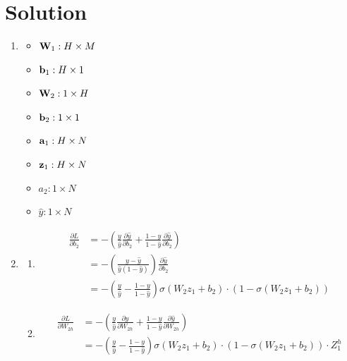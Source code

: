 \documentclass[submit]{harvardml}
\newenvironment{answer}
  {\section*{Solution}}
{}
\begin{document}
\begin{answer}
  \begin{enumerate}
    \item \begin{itemize}
            \item $\bold{W}_1 : H \times M$
            \item $\bold{b}_1 : H \times 1$
            \item $\bold{W}_2 : 1 \times H$
            \item $\bold{b}_2 : 1 \times 1$
            \item $\bold{a}_1 : H \times N$
            \item $\bold{z}_1 : H \times N$
            \item $a_2 : 1 \times N$
            \item $\hat{y} : 1 \times N$
          \end{itemize}

    \item \begin{enumerate}
            \item
                  \begin{align*}
                    \frac {\partial L}{\partial b_2} & = -\left( \frac{y}{\hat{y}} \frac{\partial \hat{y}}{\partial b_2} + \frac{1-y}{1-\hat{y}} \frac{\partial \hat{y}}{\partial b_2} \right) \\
&= -\left( \frac{y - \hat{y}}{\hat{y}(1 - \hat{y})} \right) \frac{\partial \hat{y}}{\partial b_2} \\
&= -\left( \frac{y}{\hat{y}} - \frac{1-y}{1-\hat{y}} \right) \sigma(W_2 z_1 + b_2) \cdot (1 - \sigma(W_2 z_1 + b_2))
                  \end{align*}

            \item
                  \begin{align*}
                    \frac{\partial L}{\partial W_{2h}} &= -\left( \frac{y}{\hat{y}} \frac{\partial \hat{y}}{\partial W_{2h}} + \frac{1 - y}{1 - \hat{y}} \frac{\partial \hat{y}}{\partial W_{2h}} \right) \\
&= -\left( \frac{y}{\hat{y}} - \frac{1 - y}{1 - \hat{y}} \right) \sigma(W_{2}z_{1} + b_{2}) \cdot (1 - \sigma(W_{2}z_{1} + b_{2})) \cdot Z_{1}^{h}
                  \end{align*}


\end{enumerate}
\end{enumerate}
\end{answer}
\end{document}
